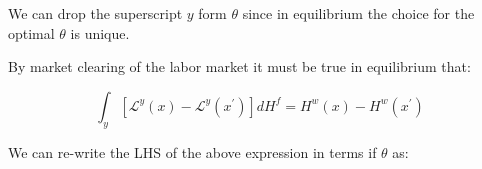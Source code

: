 \documentclass[12pt]{article}
\theoremstyle{definition}
\newcommand{\qiq}{\qquad \implies \qquad}
\begin{document}


We can drop the superscript $y$ form $\theta$ since in equilibrium the choice for the optimal $\theta$ is unique.

By market clearing of the labor market it must be true in equilibrium that:

\begin{equation}\label{mkt_clearing_eq}
\int_{y}\left[\mathcal{L}^{y}(x)-\mathcal{L}^{y}\left(x^{\prime}\right)\right] d H^{f} = H^{w}(x)-H^{w}\left(x^{\prime}\right)
\end{equation}

We can re-write the LHS of the above expression in terms if $\theta$ as:



\end{document}
